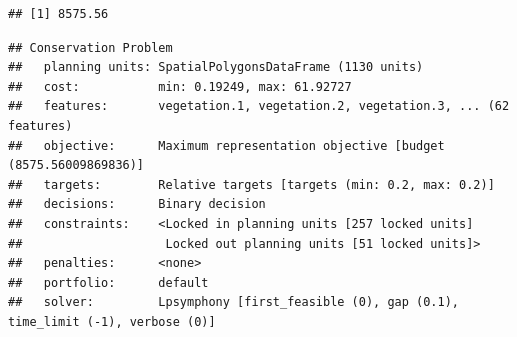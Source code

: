 \documentclass[12pt,]{book}
\newenvironment{Shaded}{\begin{snugshade}}{\end{snugshade}}
\newcommand{\KeywordTok}[1]{\textcolor[rgb]{0.13,0.29,0.53}{\textbf{#1}}}
\newcommand{\DataTypeTok}[1]{\textcolor[rgb]{0.13,0.29,0.53}{#1}}
\newcommand{\DecValTok}[1]{\textcolor[rgb]{0.00,0.00,0.81}{#1}}
\newcommand{\FloatTok}[1]{\textcolor[rgb]{0.00,0.00,0.81}{#1}}
\newcommand{\StringTok}[1]{\textcolor[rgb]{0.31,0.60,0.02}{#1}}
\newcommand{\CommentTok}[1]{\textcolor[rgb]{0.56,0.35,0.01}{\textit{#1}}}
\newcommand{\OtherTok}[1]{\textcolor[rgb]{0.56,0.35,0.01}{#1}}
\newcommand{\OperatorTok}[1]{\textcolor[rgb]{0.81,0.36,0.00}{\textbf{#1}}}
\newcommand{\NormalTok}[1]{#1}
\begin{document}
\begin{Shaded}
\end{Shaded}

\begin{verbatim}
## [1] 8575.56
\end{verbatim}

\begin{Shaded}
\end{Shaded}

\begin{verbatim}
## Conservation Problem
##   planning units: SpatialPolygonsDataFrame (1130 units)
##   cost:           min: 0.19249, max: 61.92727
##   features:       vegetation.1, vegetation.2, vegetation.3, ... (62 features)
##   objective:      Maximum representation objective [budget (8575.56009869836)]
##   targets:        Relative targets [targets (min: 0.2, max: 0.2)]
##   decisions:      Binary decision 
##   constraints:    <Locked in planning units [257 locked units]
##                    Locked out planning units [51 locked units]>
##   penalties:      <none>
##   portfolio:      default
##   solver:         Lpsymphony [first_feasible (0), gap (0.1), time_limit (-1), verbose (0)]
\end{verbatim}
\end{document}
